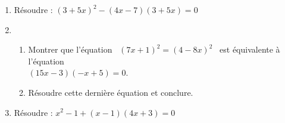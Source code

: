 
\begin{exercice}\label{exosmath-0269}

\begin{enumerate}
\item Résoudre : $(3+5x)^2 -(4x-7)(3+5x)=0$
  \smallskip
\item 
  \begin{enumerate}
  \item Montrer que l'équation \ $(7x+1)^2=(4-8x)^2$ \ est équivalente à
    l'équation \\[1ex] $(15x-3)(-x+5)=0$.
  \item Résoudre cette dernière équation et conclure.
  \end{enumerate}
  \smallskip
\item Résoudre : $x^2-1+(x-1)(4x+3)=0$
\end{enumerate}


\end{exercice}
